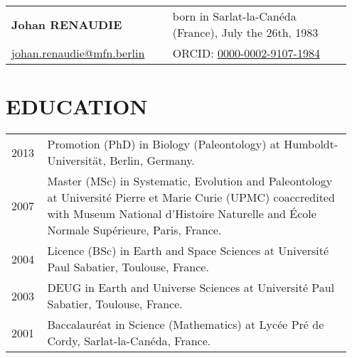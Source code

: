 \documentclass[11pt, a4paper]{article}
\begin{document}
\begin{longtable}{p{0.45\linewidth} >{\raggedleft\arraybackslash}p{0.5\linewidth}}
{\bfseries \Large Johan RENAUDIE} & born in Sarlat-la-Can\'{e}da (France), July the 26th, 1983 \\
\href{mailto:johan.renaudie@mfn.berlin}{johan.renaudie@mfn.berlin} & ORCID: \href{http://orcid.org/0000-0002-9107-1984}{0000-0002-9107-1984}\\
\hline
\end{longtable}

\section{EDUCATION}
\begin{longtable}{p{0.1\linewidth} P{0.85\linewidth}}
2013 & Promotion (PhD) in Biology (Paleontology) at Humboldt-Universit\"{a}t, Berlin, Germany.\\
2007 & Master (MSc) in Systematic, Evolution and Paleontology at Universit\'{e} Pierre et Marie Curie (UPMC) coaccredited with Museum National d'Histoire Naturelle and \'{E}cole Normale Sup\'{e}rieure, Paris, France.\\
2004 & Licence (BSc) in Earth and Space Sciences at Universit\'{e} Paul Sabatier, Toulouse, France.\\
2003 & DEUG in Earth and Universe Sciences at Universit\'{e} Paul Sabatier, Toulouse, France.\\
2001 & Baccalaur\'{e}at in Science (Mathematics) at Lyc\'{e}e Pr\'{e} de Cordy, Sarlat-la-Can\'{e}da, France.\\
\end{longtable}
\end{document}
